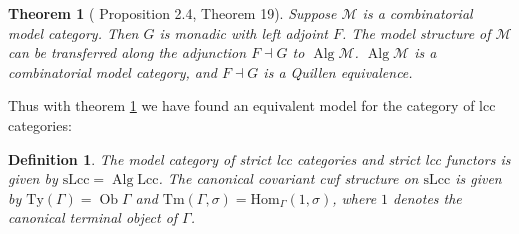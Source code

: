 \documentclass{article}
\newtheorem{theorem}{Theorem}
\newtheorem{definition}{Definition}
\begin{document}
\begin{theorem}[\cite{algebraic-models} Proposition 2.4, \cite{equipping-weak-equivalences} Theorem 19]
  \label{th:algebraically-fibrant-model-category}
  Suppose $\mathcal{M}$ is a combinatorial model category.
  Then $G$ is monadic with left adjoint $F$.
  The model structure of $\mathcal{M}$ can be transferred along the adjunction $F \dashv G$ to $\operatorname{Alg} \mathcal{M}$.
  $\operatorname{Alg} \mathcal{M}$ is a combinatorial model category, and $F \dashv G$ is a Quillen equivalence.
\end{theorem}

Thus with theorem \ref{th:algebraically-fibrant-model-category} we have found an equivalent model for the category of lcc categories:
\begin{definition}
  The model category of strict lcc categories and strict lcc functors is given by $\mathrm{sLcc} = \operatorname{Alg} \mathrm{Lcc}$.
  The canonical covariant cwf structure on $\mathrm{sLcc}$ is given by $\mathrm{Ty}(\Gamma) = \operatorname{Ob} \Gamma$ and $\mathrm{Tm}(\Gamma, \sigma) = \mathrm{Hom}_\Gamma(1, \sigma)$, where $1$ denotes the canonical terminal object of $\Gamma$.
\end{definition}
\end{document}
